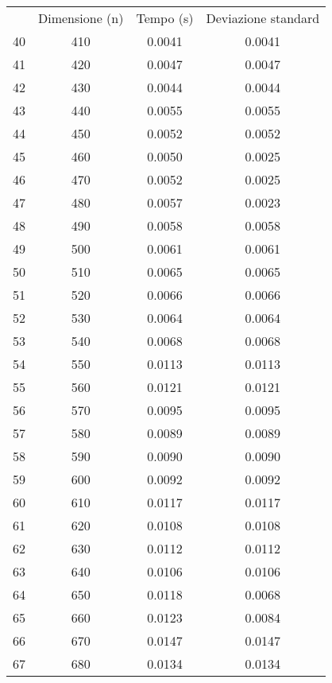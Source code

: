 \begin{table}
\centering
\begin{adjustbox}{width=1\textwidth/2}
\begin{tabular}{|c|c|c|c|}
\hline
 & Dimensione (n) & Tempo (s) & Deviazione standard \\
40 & 410 & 0.0041 & 0.0041 \\
\cline{1-4}
41 & 420 & 0.0047 & 0.0047 \\
\cline{1-4}
42 & 430 & 0.0044 & 0.0044 \\
\cline{1-4}
43 & 440 & 0.0055 & 0.0055 \\
\cline{1-4}
44 & 450 & 0.0052 & 0.0052 \\
\cline{1-4}
45 & 460 & 0.0050 & 0.0025 \\
\cline{1-4}
46 & 470 & 0.0052 & 0.0025 \\
\cline{1-4}
47 & 480 & 0.0057 & 0.0023 \\
\cline{1-4}
48 & 490 & 0.0058 & 0.0058 \\
\cline{1-4}
49 & 500 & 0.0061 & 0.0061 \\
\cline{1-4}
50 & 510 & 0.0065 & 0.0065 \\
\cline{1-4}
51 & 520 & 0.0066 & 0.0066 \\
\cline{1-4}
52 & 530 & 0.0064 & 0.0064 \\
\cline{1-4}
53 & 540 & 0.0068 & 0.0068 \\
\cline{1-4}
54 & 550 & 0.0113 & 0.0113 \\
\cline{1-4}
55 & 560 & 0.0121 & 0.0121 \\
\cline{1-4}
56 & 570 & 0.0095 & 0.0095 \\
\cline{1-4}
57 & 580 & 0.0089 & 0.0089 \\
\cline{1-4}
58 & 590 & 0.0090 & 0.0090 \\
\cline{1-4}
59 & 600 & 0.0092 & 0.0092 \\
\cline{1-4}
60 & 610 & 0.0117 & 0.0117 \\
\cline{1-4}
61 & 620 & 0.0108 & 0.0108 \\
\cline{1-4}
62 & 630 & 0.0112 & 0.0112 \\
\cline{1-4}
63 & 640 & 0.0106 & 0.0106 \\
\cline{1-4}
64 & 650 & 0.0118 & 0.0068 \\
\cline{1-4}
65 & 660 & 0.0123 & 0.0084 \\
\cline{1-4}
66 & 670 & 0.0147 & 0.0147 \\
\cline{1-4}
67 & 680 & 0.0134 & 0.0134 \\
\cline{1-4}

\end{tabular}
\end{adjustbox}
\end{table}

